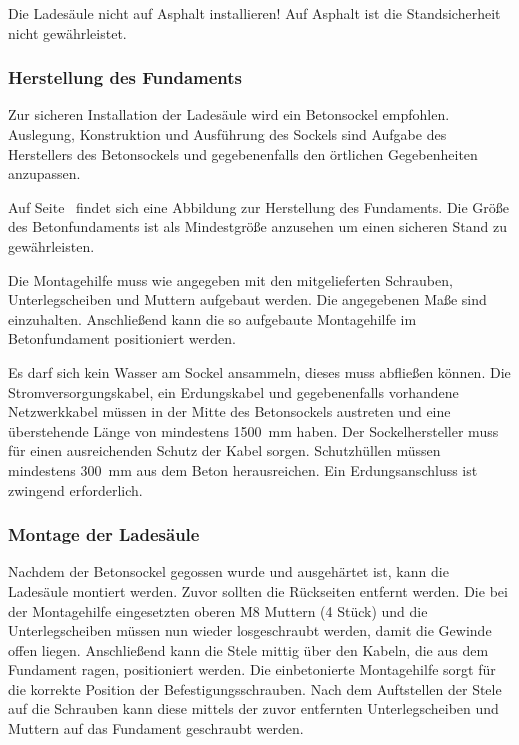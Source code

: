 \documentclass[a4paper,10pt]{article}
\newcommand{\hint}[1]{\begin{tcolorbox}[colback=boxgray,colframe=black,coltext=
white,title=Hinweis]#1\end{tcolorbox}}
\begin{document}
\begin{multicols*}{2}
    \hint{Die Ladesäule nicht auf Asphalt installieren! Auf Asphalt ist die
	Standsicherheit nicht gewährleistet.}


	\subsubsection{Herstellung des Fundaments}
    Zur sicheren Installation der Ladesäule wird ein Betonsockel empfohlen.
	Auslegung, Konstruktion und Ausführung des Sockels sind Aufgabe des
	Herstellers des Betonsockels und gegebenenfalls den örtlichen Gegebenheiten
	anzupassen.

	Auf Seite~\pageref{appendix_base} findet sich eine
	Abbildung zur Herstellung des Fundaments. Die Größe des Betonfundaments ist als
	Mindestgröße anzusehen um einen sicheren Stand zu gewährleisten.

	Die Montagehilfe muss wie angegeben mit den mitgelieferten Schrauben,
	Unterlegscheiben und Muttern aufgebaut werden. Die angegebenen Maße sind
	einzuhalten. Anschließend kann die so aufgebaute Montagehilfe im
	Betonfundament positioniert werden.

	Es darf sich kein Wasser am Sockel ansammeln, dieses muss abfließen können. Die
	Stromversorgungskabel, ein Erdungskabel und gegebenenfalls vorhandene Netzwerkkabel müssen in der Mitte
	des Betonsockels austreten und eine überstehende Länge von mindestens
	\SI{1500}{\milli\meter} haben. Der Sockelhersteller muss
	für einen ausreichenden Schutz der Kabel sorgen. Schutzhüllen müssen mindestens
	\SI{300}{\milli\meter} aus dem Beton herausreichen. Ein Erdungsanschluss ist
	zwingend erforderlich.

	\subsubsection{Montage der Ladesäule}
	Nachdem der Betonsockel gegossen wurde und ausgehärtet ist, kann
	die Ladesäule montiert werden. Zuvor sollten die Rückseiten
	entfernt werden. Die bei der Montagehilfe
	eingesetzten oberen M8 Muttern (4 Stück) und die Unterlegscheiben müssen nun wieder losgeschraubt werden,
	damit die Gewinde offen liegen. Anschließend kann die Stele mittig über den
	Kabeln, die aus dem Fundament ragen, positioniert werden. Die
	einbetonierte Montagehilfe sorgt für die korrekte Position der
	Befestigungsschrauben. Nach dem Auftstellen der Stele auf die Schrauben kann diese
	mittels der zuvor entfernten Unterlegscheiben und Muttern auf das Fundament
	geschraubt werden.


\end{multicols*}
\end{document}
